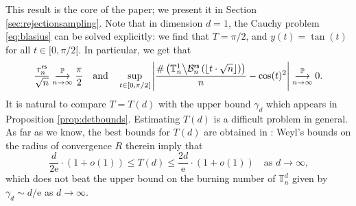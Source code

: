 \documentclass[a4paper,11pt]{article}
\begin{document}
This result is the core of the paper; we present it in Section \ref{sec:rejectionsampling}.
Note that in dimension $d=1$, the Cauchy problem \eqref{eq:blasius} can be solved explicitly: we find that $T=\pi/2$, and $y(t)=\tan(t)$ for all $t\in{[0,\pi/2[}$.
In particular, we get that
\[\frac{\tau_n^\mathsf{rs}}{\sqrt{n}}\underset{n\to\infty}{\overset{\mathbb{P}}{\longrightarrow}}\frac{\pi}{2}\quad\text{and}\quad\sup_{t\in[0,\pi/2[}\left|\frac{\#\left(\mathbb{T}_n^1\middle\backslash\mathcal{B}_n^\mathsf{rs}\left(\left\lfloor t\cdot\sqrt{n}\right\rfloor\right)\right)}{n}-\cos(t)^2\right|\underset{n\to\infty}{\overset{\mathbb{P}}{\longrightarrow}}0.\]
It is natural to compare $T = T(d)$ with the upper bound $ \gamma_d$ which appears in Proposition \ref{prop:detbounds}.
Estimating $T(d)$ is a difficult problem in general.
As far as we know, the best bounds for $T(d)$ are obtained in \cite[p.391]{weyl}: Weyl's bounds on the radius of convergence $R$ therein imply that
\[\frac{d}{2\mathrm{e}}\cdot(1+o(1))\leq T(d)\leq\frac{2d}{\mathrm{e}}\cdot(1+o(1))\quad\text{as $d\to\infty$,}\]
which does not beat the upper bound on the burning number of $\mathbb{T}_n^d$ given by $\gamma_d\sim d/\mathrm{e}$ as $d\to\infty$.
\end{document}
